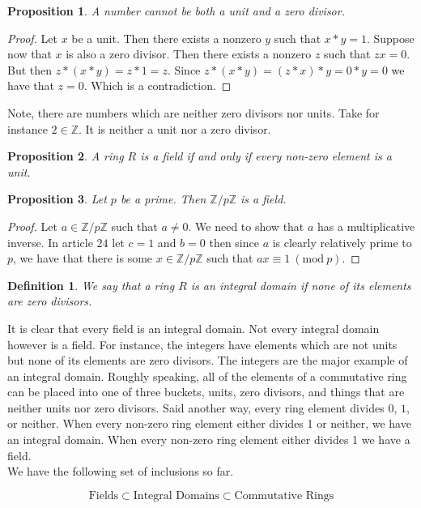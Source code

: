 \documentclass{article}
\theoremstyle{problemstyle}
\newtheorem{proposition}{Proposition}
\newtheorem{definition}{Definition}
\newcommand{\Mod}[1]{\ (\mathrm{mod}\ #1)}
\begin{document}

\begin{proposition}
A number cannot be both a unit and a zero divisor.  
\end{proposition}

\begin{proof}
Let $x$ be a unit. Then there exists a nonzero $y$ such that $x*y = 1$. Suppose now that $x$ is also a zero divisor. Then there exists a nonzero $z$ such that $zx = 0$. But then $z*(x*y) = z*1 = z$. Since  $z*(x*y) = (z*x)*y = 0*y = 0$ we have that $z = 0$. Which is a contradiction.  
\end{proof}

Note, there are numbers which are neither zero divisors nor units. Take for instance $2 \in \mathbb{Z}$. It is neither a unit nor a zero divisor. 

\begin{proposition}
A ring $R$ is a field if and only if every non-zero element is a unit. 
\end{proposition}

\begin{proposition}
Let $p$ be a prime. Then $\mathbb{Z}/p\mathbb{Z}$ is a field. 
\end{proposition}

\begin{proof}
Let $a \in \mathbb{Z}/p\mathbb{Z}$ such that $a \neq 0$. We need to show that $a$ has a multiplicative inverse. In article $24$ let $c = 1$ and $b = 0$ then since $a$ is clearly relatively prime to $p$, we have that there is some $x \in \mathbb{Z}/p\mathbb{Z}$ such that $ax \equiv 1 \Mod{p}$.
\end{proof}

\begin{definition}
We say that a ring $R$ is an integral domain if none of its elements are zero divisors. 
\end{definition}

It is clear that every field is an integral domain. Not every integral domain however is a field. For instance, the integers have elements which are not units but none of its elements are zero divisors. The integers are the major example of an integral domain. Roughly speaking, all of the elements of a commutative ring can be placed into one of three buckets, units, zero divisors, and things that are neither units nor zero divisors. Said another way, every ring element divides $0$, $1$, or neither. When every non-zero ring element either divides 1 or neither, we have an integral domain. When every non-zero ring element either divides 1 we have a field. \\

We have the following set of inclusions so far. 

$$\text{Fields} \subset \text{Integral Domains} \subset \text{Commutative Rings}$$
\end{document}
